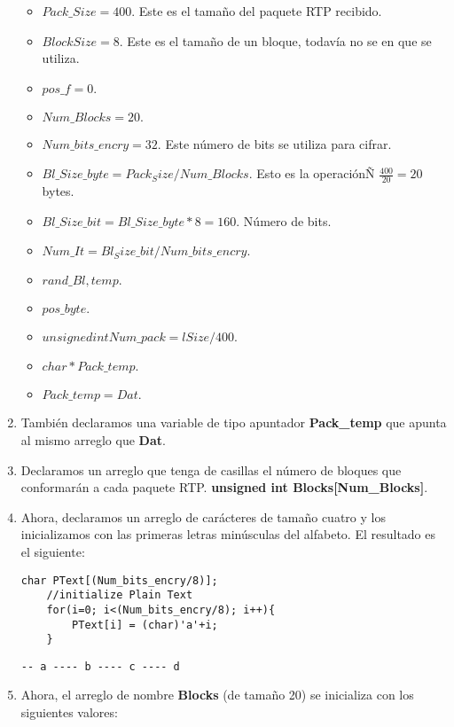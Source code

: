 \documentclass[10pt]{IEEEtran}
\begin{document}
\begin{enumerate}
\begin{itemize}
\item	   $  Pack\_Size = 400.$ Este es el tamaño del paquete RTP recibido. 
\item	   $   BlockSize = 8.$ Este es el tamaño de un bloque, todavía no se en que se utiliza.
\item	 $pos\_f = 0.$
\item	 $Num\_Blocks = 20.$
\item	 $ Num\_bits\_encry = 32.$ Este número de bits se utiliza para cifrar.
\item	 $ Bl\_Size\_byte = Pack_Size/Num\_Blocks.$ Esto es la operaciónÑ $\frac{400}{20}=20$ bytes.
\item	 $ Bl\_Size\_bit = Bl\_Size\_byte*8=160.$ Número de bits.
\item	 $ Num\_It = Bl_Size\_bit/Num\_bits\_encry. $
\item	 $ rand\_Bl,temp. $
\item	 $ pos\_byte. $
\item    $ unsigned int Num\_pack = lSize/400.$
\item	$ char *Pack\_temp.$
\item	$ Pack\_temp = Dat.$

\end{itemize}


\item También declaramos una variable de tipo apuntador \textbf{Pack\_temp} que apunta al mismo arreglo que \textbf{Dat}.

\item Declaramos un arreglo que tenga de casillas el número de bloques que conformarán a cada paquete RTP.
      \textbf{unsigned int Blocks[Num\_Blocks]}.
      
\item Ahora, declaramos un arreglo de carácteres de tamaño cuatro y los inicializamos con las primeras letras minúsculas del alfabeto. El resultado es el siguiente:

\begin{verbatim}
char PText[(Num_bits_encry/8)];
	//initialize Plain Text
	for(i=0; i<(Num_bits_encry/8); i++){
		PText[i] = (char)'a'+i;
	}
\end{verbatim}
 
 
 \begin{verbatim}
-- a ---- b ---- c ---- d 
\end{verbatim}

\item Ahora, el arreglo de nombre \textbf{Blocks} (de tamaño 20) se inicializa con los siguientes valores:


\end{enumerate}
\end{document}
